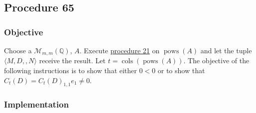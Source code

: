 \documentclass[twocolumn]{article}
\DeclareMathOperator{\pows}{pows}
\DeclareMathOperator{\cols}{cols}
\begin{document}
		\subsection{Procedure 65}\label{sec:procedure 65}
			\subsubsection{Objective}
				Choose a $\mathcal{M}_{m,m}(\mathbb{Q})$, $A$. Execute \hyperref[sec:procedure 21]{procedure 21} on $\pows(A)$ and let the tuple $\langle M,D,,N\rangle$ receive the result. Let $t=\cols(\pows(A))$. The objective of the following instructions is to show that either $0<0$ or to show that ${C_t(D)}={C_t(D)}_{1,1}e_1\ne 0$.
			\subsubsection{Implementation}
\end{document}
